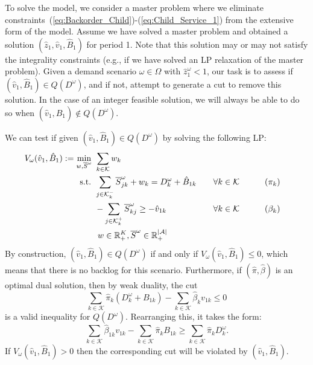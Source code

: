\documentclass[11pt]{article}
\newcommand{\ka}{k} %
\newcommand{\KA}{\mathcal{K}}
\newcommand{\Ka}{K}
\newcommand{\jey}{j} %
\newcommand{\Graf}{\mathcal{A}} %
\newcommand{\Bi}{B} %
\newcommand{\Vi}{v} %
\newcommand{\Zed}{z} %
\newcommand{\m}{\omega} %
\newcommand{\EM}{\Omega} %
\newcommand{\Csub}{\mathcal{K}^+_k}
\newcommand{\Psub}{\mathcal{K}^-_k}
\newcommand{\Sc}{\overline{S}}
\begin{document}
\newcommand{\vsol}{\hat{\Vi}}
\newcommand{\zsol}{\hat{\Zed}}
\newcommand{\bsol}{\hat{\Bi}}
\newcommand{\pisol}{\hat{\pi}}
\newcommand{\betasol}{\hat{\beta}}

To solve the model, we consider a  master problem where we eliminate constraints~(\ref{eq:Backorder_Child})-(\ref{eq:Child_Service_1}) from the extensive form of the model. Assume we have solved a master problem and obtained a solution $(\zsol_1,\vsol_1,\bsol_1)$ for period 1. Note that this solution may or may not satisfy the integrality constraints (e.g., if we have solved an LP relaxation of the master problem). Given a demand scenario $\m \in \EM$ with $\zsol_1^\m < 1$, our task is to assess if $(\vsol_1,\bsol_1) \in Q(D^\m)$, and if not, attempt to generate a cut to remove this solution. In the case of an integer feasible solution, we will always be able to do so when $(\vsol_1,\bsol_1) \notin Q(D^\m)$.

We can test if given $(\vsol_1,\bsol_1) \in Q(D^\m)$ by solving the following LP:
\begin{alignat}{3}
V_\m(\vsol_1,\bsol_1) :=  \min_{w,\Sc^\m} \ & \sum_{\ka  \in \KA} w_\ka \notag\\
    \text{s.t. } & \sum_{\jey \in  \Psub} \Sc^\m_{\jey \ka } + w_\ka = D^ {\m}_{\ka} + \bsol_{1\ka} \quad  &&\forall \ka  \in \KA && \qquad(\pi_\ka) \notag\\
    &-\sum_{\jey \in  \Csub} \Sc^\m_{\ka \jey} \geq -\vsol_{1\ka} \ && \forall \ka  \in \KA&& \qquad (\beta_\ka) \notag\\
    & \ w \in \mathbb{R}_+^{\Ka}, \Sc^\m \in \mathbb{R}_+^{|\Graf|} \notag
\end{alignat}
By construction, $(\vsol_1,\bsol_1) \in Q(D^\m)$ if and only if $V_\m(\vsol_1,\bsol_1) \leq 0$, which means that there is no backlog for this scenario. Furthermore, if $(\pisol,\betasol)$ is an optimal dual solution, then by weak duality, the cut
 \[ \sum_{\ka  \in \KA} \pisol_k (D^ {\m}_{\ka} + \Bi_{1\ka}) - \sum_{\ka  \in \KA} \betasol_\ka \Vi_{1\ka} \leq 0 \]
is a valid inequality for $Q(D^\m)$. Rearranging this, it takes the form:
\[ \sum_{\ka  \in \KA} \betasol_{1\ka} \Vi_{1\ka} - \sum_{\ka  \in \KA} \pisol_k \Bi_{1\ka}  \geq  \sum_{\ka  \in \KA} \pisol_k D^ {\m}_{\ka}. \]
If $V_\m(\vsol_1,\bsol_1) > 0$ then the corresponding cut will be violated by $(\vsol_1,\bsol_1)$. 
\end{document}
